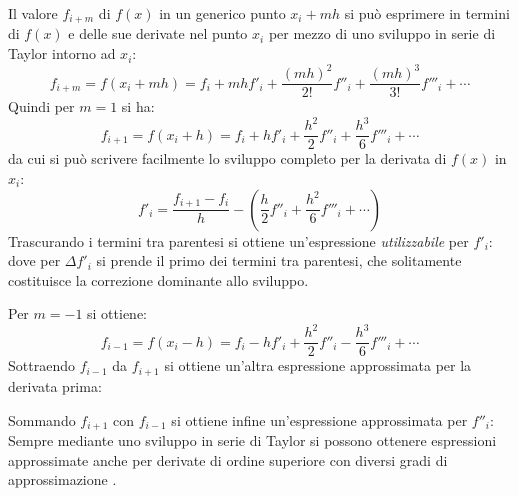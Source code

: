 Il valore $f_{i+m}$ di $f(x)$ in un generico punto $x_i + mh$ si pu\`o
esprimere in termini di $f(x)$ e delle sue derivate nel punto $x_i$
per mezzo di uno sviluppo in serie di Taylor intorno ad $x_i$:
$$
f_{i+m} = f(x_i + mh) = f_i + mhf'_i + \frac{(m h)^2}{2!} f''_i +
\frac{(m h)^3}{3!}f'''_i + \cdots
$$
Quindi per $m=1$ si ha:
$$
f_{i+1} = f(x_i + h) = f_i + h f'_i + \frac{h^2}{2}f''_i+
\frac{h^3}{6}f'''_i + \cdots
$$
da cui si pu\`o scrivere facilmente lo sviluppo completo per la derivata
di $f(x)$ in $x_i$:
$$
f'_i=\frac{f_{i+1}-f_i}{h}-
\left(\frac{h}{2}f''_i+\frac{h^2}{6}f'''_i+ \cdots\right)
$$
Trascurando i termini tra parentesi si ottiene un'espressione
{\itshape utilizzabile} per $f'_i$:
dove per $\Delta f'_i$ si prende il primo dei termini tra parentesi,
che solitamente costituisce la correzione dominante allo sviluppo.

Per $m=-1$ si ottiene:
$$
f_{i-1} = f(x_i - h) = f_i-h f'_i + \frac{h^2}{2}f''_i -
\frac{h^3}{6}f'''_i + \cdots
$$
Sottraendo $f_{i-1}$ da $f_{i+1}$ si ottiene un'altra espressione approssimata
per la derivata prima:

\noindent Sommando $f_{i+1}$ con $f_{i-1}$ si ottiene infine  un'espressione
approssimata per $f''_i$:
Sempre mediante uno sviluppo in serie di Taylor si possono ottenere
espressioni approssimate anche per derivate di ordine superiore con diversi
gradi di approssimazione \cite{McCormick}.


